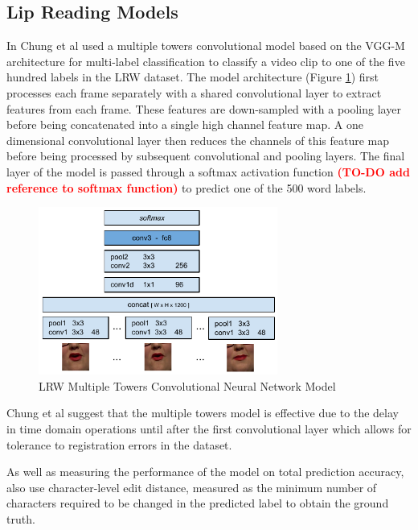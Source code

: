 \documentclass[12pt]{report}
\begin{document}
\subsection{Lip Reading Models}
In \cite{Chung2016} Chung et al used a multiple towers convolutional model based on the VGG-M architecture for multi-label classification to classify a video clip to one of the five hundred labels in the LRW dataset.
The model architecture (Figure \ref{fig:LRW_Multiple_Towers}) first processes each frame separately with a shared convolutional layer to extract features from each frame.
These features are down-sampled with a pooling layer before being concatenated into a single high channel feature map.
A one dimensional convolutional layer then reduces the channels of this feature map before being processed by subsequent convolutional and pooling layers.
The final layer of the model is passed through a softmax activation function \textcolor{red}{\textbf{(TO-DO add reference to softmax function)}} to predict one of the 500 word labels.

\begin{figure}[h]
    \centering
        \includegraphics[width=0.7\textwidth]{figures/lrw_multiple_towers.png}
    \caption{LRW Multiple Towers Convolutional Neural Network Model \cite{Chung2016}}\label{fig:LRW_Multiple_Towers}
\end{figure}

Chung et al suggest that the multiple towers model is effective due to the delay in time domain operations until after the first convolutional layer which allows for tolerance to registration errors in the dataset.

As well as measuring the performance of the model on total prediction accuracy, \cite{Chung2016} also use character-level edit distance, measured as the minimum number of characters required to be changed in the predicted label to obtain the ground truth.
\end{document}
